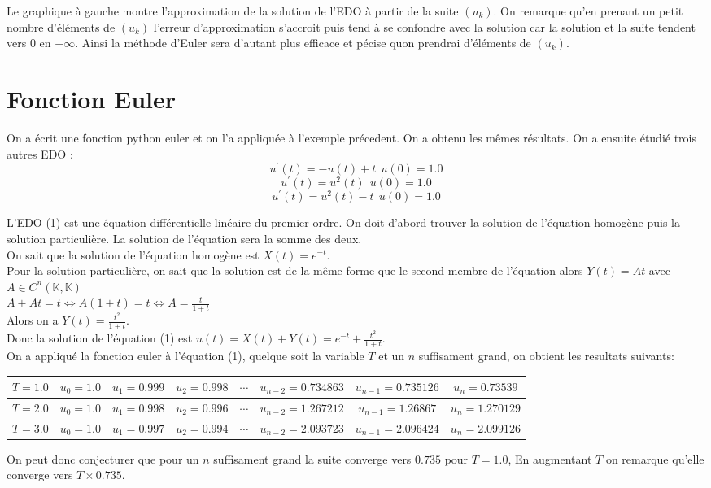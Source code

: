 \documentclass{article}
\begin{document}
Le graphique à gauche montre l'approximation de la solution de l'EDO à partir de la suite $(u_k)$. On remarque qu'en prenant un petit nombre d'éléments de $(u_k)$ l'erreur d'approximation s'accroit puis tend à se confondre avec la solution car la solution et la suite tendent vers $0$ en $+\infty$. Ainsi la méthode d'Euler sera d'autant plus efficace et pécise quon prendrai d'éléments de $(u_k)$.

\section{Fonction Euler}

On a écrit une fonction python euler et on l'a appliquée à l'exemple précedent. On a obtenu les mêmes résultats.
On a ensuite étudié trois autres EDO :
\begin{equation}
u^{'}(t)=-u(t)+t ~~ u(0)=1.0
\end{equation}
\begin{equation}
u^{'}(t)=u^{2}(t) ~~ u(0)=1.0 
\end{equation}
\begin{equation}
u^{'}(t)=u^{2}(t)-t ~~ u(0)=1.0 
\end{equation}

L'EDO (1) est une équation différentielle linéaire du premier ordre. On doit d'abord trouver la solution de l'équation homogène puis la solution particulière. La solution de l'équation sera la somme des deux.\\

On sait que la solution de l'équation homogène est $ X(t)=e^{-t}$.\\
Pour la solution particulière, on sait que la solution est de la même forme que le second membre de l'équation alors $Y(t)=At$ avec $A\in C^{n}(\mathbb{K},\mathbb{K})$\\
$A+At=t \iff A(1+t)=t \iff A=\frac{t}{1+t}$ \\
Alors on a $Y(t)=\frac{t^2}{1+t}$.\\
Donc la solution de l'équation (1) est $u(t)= X(t)+Y(t)=e^{-t}+\frac{t^2}{1+t}$. \\

On a appliqué la fonction euler à l'équation (1), quelque soit la variable $T$ et un $n$ suffisament grand, on obtient les resultats suivants:
\begin{center}
\begin{tabular}{|c|c|c|c|c|c|c|c|}
\hline
$T=1.0$ &$u_{0}=1.0$ & $u_{1}=0.999$ & $u_{2}=0.998$ & $\cdots$ & $u_{n-2}=0.734863$ & $u_{n-1}=0.735126$ & $u_{n}=0.73539$ \\
\hline
$T=2.0$ &$u_{0}=1.0$ & $u_{1}=0.998$ & $u_{2}=0.996$ &$ \cdots$ & $u_{n-2}=1.267212$ & $u_{n-1}=1.26867$ & $u_{n}=1.270129$ \\
\hline
$T=3.0$ &$u_{0}=1.0$ & $u_{1}=0.997$ & $u_{2}=0.994$ & $\cdots$ & $u_{n-2}=2.093723$ & $u_{n-1}=2.096424$ & $u_{n}=2.099126$ \\
\hline
\end{tabular}
\end{center}
On peut donc conjecturer que pour un $n$ suffisament grand la suite converge vers $0.735$ pour $T=1.0$, En augmentant $T $ on remarque qu'elle converge vers $T\times 0.735$.\\
\end{document}

